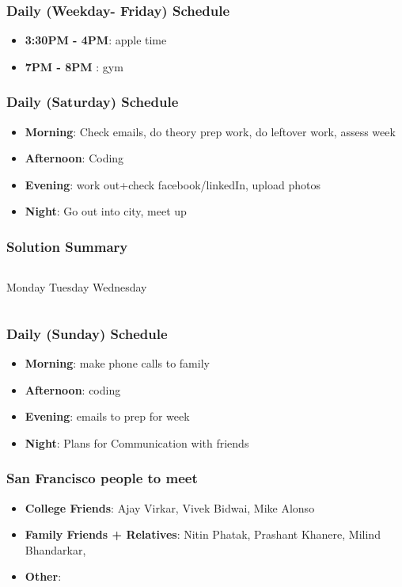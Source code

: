 \begin{frame} 
\frametitle{Daily (Weekday- Friday) Schedule} 
\begin{itemize}
\item \textbf{3:30PM - 4PM}: apple time 
\item \textbf{7PM - 8PM} : gym  
\end{itemize} 
\end{frame}

\begin{frame} 
\frametitle{Daily (Saturday) Schedule}
\begin{itemize} 
\item \textbf{Morning}:
Check emails, 
do theory prep work, 
do leftover work, 
assess week 
\item \textbf{Afternoon}: Coding 
\item \textbf{Evening}: work out+check facebook/linkedIn, upload photos
\item \textbf{Night}: Go out into city, meet up 
\end{itemize} 
\end{frame}

\begin{frame}
\frametitle{Solution Summary}
\begin{columns}
Monday
Tuesday
Wednesday
\end{columns}
\end{frame}


\begin{frame} 
\frametitle{Daily (Sunday) Schedule}
\begin{itemize} 
\item \textbf{Morning}: make phone calls to family 
\item \textbf{Afternoon}: coding
\item \textbf{Evening}: emails to prep for week 
\item \textbf{Night}: Plans for Communication with friends  
\end{itemize} 
\end{frame}

\begin{frame} 
\frametitle{San Francisco people to meet}
\begin{itemize} 
\item \textbf{College Friends}: Ajay Virkar, Vivek Bidwai, Mike Alonso 
\item \textbf{Family Friends + Relatives}:  Nitin Phatak, Prashant Khanere, Milind Bhandarkar, 
\item \textbf{Other}: 
\end{itemize} 
\end{frame}

